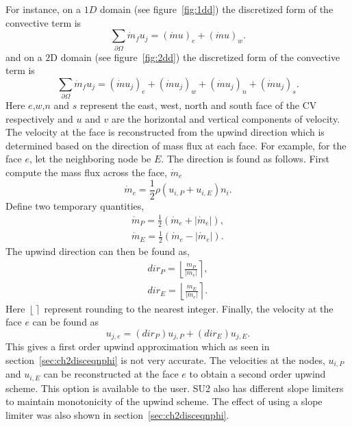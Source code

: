 For instance, on a $1D$ domain (see figure~\ref{fig:1dd}) the discretized form of the convective term is
\begin{equation}
\sum_{\partial \Omega}\dot{m}_f u_j = (\dot{m}u)_e + (\dot{m}u)_w.
\end{equation}
and on a $2$D domain (see figure~\ref{fig:2dd}) the discretized form of the convective term is
\begin{equation}
\sum_{\partial \Omega}\dot{m}_f u_j = (\dot{m}u_j)_e + (\dot{m}u_j)_w + (\dot{m}u_j)_n + (\dot{m}u_j)_s.
\end{equation}
Here $e$,$w$,$n$ and $s$ represent the east, west, north and south face of the CV respectively and $u$ and $v$ are the horizontal and vertical components of velocity. The velocity at the face is reconstructed from the upwind direction which is determined based on the direction of mass flux at each face. For example, for the face $e$, let the neighboring node be $E$. The direction is found as follows. First compute the mass flux across the face, $\dot{m}_e$
\begin{equation*}
\dot{m}_e = \frac{1}{2}\rho (u_{i,P} + u_{i,E})n_i.
\end{equation*}
Define two temporary quantities,
\begin{align*}
\dot{m}_P = \frac{1}{2}(\dot{m}_e + |\dot{m}_e|), \\
\dot{m}_E = \frac{1}{2}(\dot{m}_e - |\dot{m}_e|).
\end{align*}
The upwind direction can then be found as,
\begin{align*}
dir_P = \left\lfloor \frac{\dot{m}_P}{|\dot{m}_e|}\right\rceil, \\
dir_E = \left\lfloor \frac{\dot{m}_E}{|\dot{m}_e|}\right\rceil.
\end{align*}
\noindent Here $ \left\lfloor\right\rceil$ represent rounding to the nearest integer. 
Finally, the velocity at the face $e$ can be found as
\begin{equation}
u_{j,e} = (dir_P) u_{j,P} + (dir_E) u_{j,E}.
\end{equation}
This gives a first order upwind approximation which as seen in section~\ref{sec:ch2disceqnphi} is not very accurate. The velocities at the nodes, $u_{i,P}$ and $u_{i,E}$ can be reconstructed at the face $e$ to obtain a second order upwind scheme. This option is available to the user. SU2 also has different slope limiters to maintain monotonicity of the upwind scheme. The effect of using a slope limiter was also shown in section~\ref{sec:ch2disceqnphi}.


